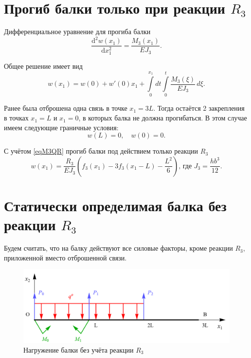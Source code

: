 \documentclass[12pt, a4paper]{article}
\begin{document}
	\section{Прогиб балки только при реакции $R_3$} 
	
	Дифференциальное уравнение для прогиба балки
	\[
	\dfrac{\mathrm{d}^2 w(x_1)}{\mathrm{d} x_1^2} = \dfrac{M_3(x_1)}{E J_3}.
	\]
	
	Общее решение имеет вид
	\vspace{-0.5em}
	\begin{equation}
		w(x_1) = w(0) + w'(0) x_1 + \int\limits_0^{x_1} \! dt \int\limits_0^t \dfrac{M_3(\xi)}{E J_3} \, d \xi.
		\label{eqw}
	\end{equation}
	
	Ранее была отброшена одна связь в точке $x_1 = 3L$. Тогда остаётся 2 закрепления в точках $x_1 = L$ и $x_1 = 0$, в которых балка не должна прогибаться. В этом случае имеем следующие граничные условия:
	\vspace{-0.5em}
	\begin{equation}
		w(L) = 0, \quad w(0) = 0.
		\label{eqwGU}
	\end{equation}
	
	\vspace{-0.5em}
	
	С учётом \eqref{eqM3QR} прогиб балки под действием только реакции $R_3$
	\begin{equation}
		w(x_1) = \dfrac{R_3}{E J_3} \left( f_3(x_1) - 3 f_3(x_1 - L) - \dfrac{L^2}{6} \right) \text{, где } J_3 = \frac{h b^3}{12}.
		\label{eqwR3}
	\end{equation}
	
	\newpage
	
	\section{Статически определимая балка без реакции $R_3$} 
	
	Будем считать, что на балку действуют все силовые факторы, кроме реакции $R_3$, приложенной вместо отброшенной связи.
	
	\begin{figure}[!h]
		\centering
		\includegraphics[width=0.75\linewidth]{plot-7}
		\caption{Нагружение балки без учёта реакции $R_3$}
	\end{figure}
	
\end{document}

